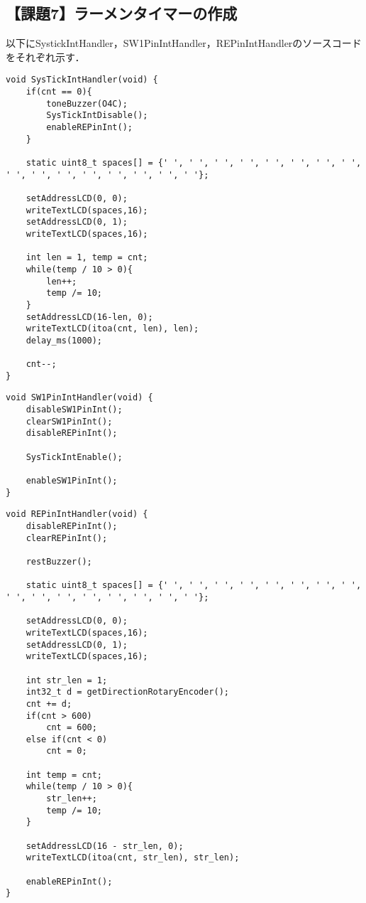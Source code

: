 \documentclass{jlreq}
\begin{document}
\subsection{【課題7】ラーメンタイマーの作成}
以下にSystickIntHandler，SW1PinIntHandler，REPinIntHandlerのソースコードをそれぞれ示す．
\begin{lstlisting}[label=a7Systick,caption={【課題7】におけるSystickIntHandler関数}]
void SysTickIntHandler(void) {
    if(cnt == 0){
        toneBuzzer(O4C);
        SysTickIntDisable();
        enableREPinInt();
    }

    static uint8_t spaces[] = {' ', ' ', ' ', ' ', ' ', ' ', ' ', ' ', ' ', ' ', ' ', ' ', ' ', ' ', ' ', ' '};

    setAddressLCD(0, 0);
    writeTextLCD(spaces,16);
    setAddressLCD(0, 1);
    writeTextLCD(spaces,16);

    int len = 1, temp = cnt;
    while(temp / 10 > 0){
        len++;
        temp /= 10;
    }
    setAddressLCD(16-len, 0);
    writeTextLCD(itoa(cnt, len), len);
    delay_ms(1000);

    cnt--;
}
\end{lstlisting}

\begin{lstlisting}[label=a7SW1,caption={【課題7】におけるSW1PinIntHandler関数}]
void SW1PinIntHandler(void) {
    disableSW1PinInt();
    clearSW1PinInt();
    disableREPinInt();

    SysTickIntEnable();

    enableSW1PinInt();
}
\end{lstlisting}

\begin{lstlisting}[label=a7RE,caption={【課題7】におけるREPinIntHandler関数}]
void REPinIntHandler(void) {
    disableREPinInt();
    clearREPinInt();

    restBuzzer();

    static uint8_t spaces[] = {' ', ' ', ' ', ' ', ' ', ' ', ' ', ' ', ' ', ' ', ' ', ' ', ' ', ' ', ' ', ' '};

    setAddressLCD(0, 0);
    writeTextLCD(spaces,16);
    setAddressLCD(0, 1);
    writeTextLCD(spaces,16);

    int str_len = 1;
    int32_t d = getDirectionRotaryEncoder();
    cnt += d;
    if(cnt > 600)
        cnt = 600;
    else if(cnt < 0)
        cnt = 0;

    int temp = cnt;
    while(temp / 10 > 0){
        str_len++;
        temp /= 10;
    }

    setAddressLCD(16 - str_len, 0);
    writeTextLCD(itoa(cnt, str_len), str_len);

    enableREPinInt();
}
\end{lstlisting}
\end{document}
